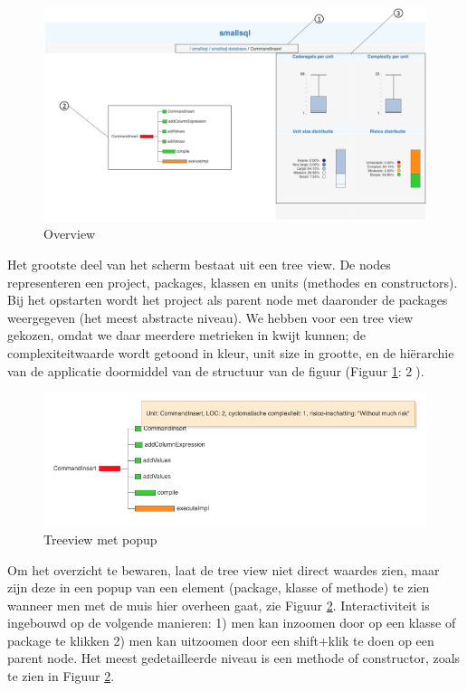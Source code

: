 \documentclass[a4paper]{article}
\begin{document}
\begin{figure}[h]
  \includegraphics[width=\linewidth]{images/overview_with_numbers.png}
  \caption{Overview}
  \label{fig:overview}
\end{figure}
 
Het grootste deel van het scherm bestaat uit een tree view. De nodes representeren een project, packages, klassen en units (methodes en constructors). Bij het opstarten wordt het project als parent node met daaronder de packages weergegeven (het meest abstracte niveau). We hebben voor een tree view gekozen, omdat we daar meerdere metrieken in kwijt kunnen; de complexiteitwaarde wordt getoond in kleur, unit size in grootte, en de hiërarchie van de applicatie doormiddel van de structuur van de figuur (Figuur \ref{fig:overview}: \textcircled{2}). 
\begin{figure}[h]
  \includegraphics[width=\linewidth]{images/treeview_with_popup.png}
  \caption{Treeview met popup}
  \label{fig:treeview_popup}
\end{figure}
Om het overzicht te bewaren, laat de tree view niet direct waardes zien, maar zijn deze in een popup van een element (package, klasse of methode) te zien wanneer men met de muis hier overheen gaat, zie Figuur \ref{fig:treeview_popup}. Interactiviteit is ingebouwd op de volgende manieren: 1) men kan inzoomen door op een klasse of package te klikken 2) men kan uitzoomen door een shift+klik te doen op een parent node. Het meest gedetailleerde niveau is een methode of constructor, zoals te zien in Figuur \ref{fig:treeview_popup}.
\end{document}
